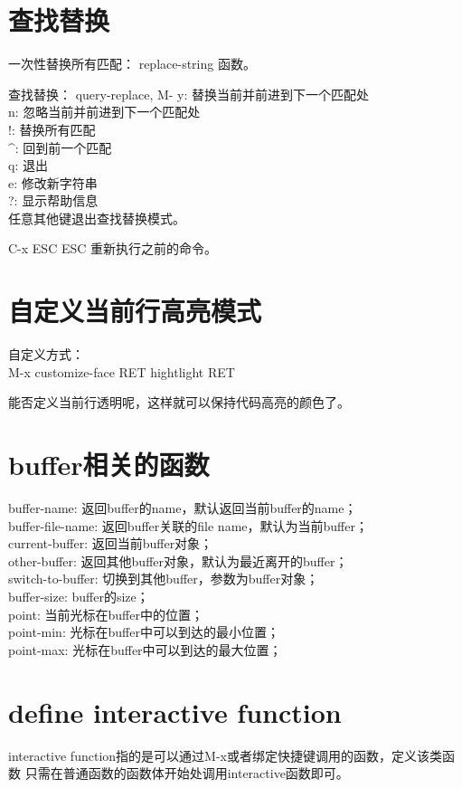 ﻿\documentclass[a4paper,11pt]{article}
\begin{document}
  \section[查找替换]{查找替换}
  一次性替换所有匹配： replace-string 函数。

  查找替换： query-replace, M-%
  y: 替换当前并前进到下一个匹配处\\
  n: 忽略当前并前进到下一个匹配处\\
  !: 替换所有匹配\\
  \^{}: 回到前一个匹配\\
  q: 退出\\
  e: 修改新字符串\\
  ?: 显示帮助信息\\
  任意其他键退出查找替换模式。

  C-x ESC ESC 重新执行之前的命令。

  \section[自定义当前行高亮模式]{自定义当前行高亮模式}
  自定义方式：\\
  M-x customize-face RET hightlight RET

  能否定义当前行透明呢，这样就可以保持代码高亮的颜色了。


  \section[buffer相关的函数]{buffer相关的函数}
  buffer-name: 返回buffer的name，默认返回当前buffer的name；\\
  buffer-file-name: 返回buffer关联的file name，默认为当前buffer；\\
  current-buffer: 返回当前buffer对象；\\
  other-buffer: 返回其他buffer对象，默认为最近离开的buffer；\\
  switch-to-buffer: 切换到其他buffer，参数为buffer对象；\\
  buffer-size: buffer的size；\\
  point: 当前光标在buffer中的位置；\\
  point-min: 光标在buffer中可以到达的最小位置；\\
  point-max: 光标在buffer中可以到达的最大位置；\\
  

  \section[define interactive function]{define interactive function}
  interactive function指的是可以通过M-x或者绑定快捷键调用的函数，定义该类函数
  只需在普通函数的函数体开始处调用interactive函数即可。
\end{document}
